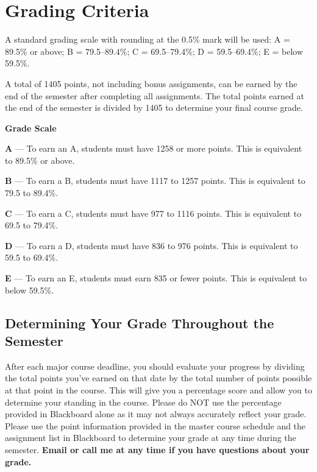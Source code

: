 \section*{Grading Criteria}

A standard grading scale with rounding at the 0.5\% mark will be used: A = 89.5\% or above; B = 79.5--89.4\%; C = 69.5--79.4\%; D = 59.5--69.4\%; E = below 59.5\%.

A total of 1405 points, not including bonus assignments, can be earned by the end of the semester after completing all assignments. The total points earned at the end of the semester is divided by 1405 to determine your final course grade.

\begin{tcolorbox}[
  enhanced,
  colback=blue!2,
  colframe=DeepBlue,
  boxrule=0.8pt,
  arc=3pt,
  left=10pt,
  right=10pt,
  top=8pt,
  bottom=8pt
]
{\bfseries\color{DeepBlue} Grade Scale}

\vspace{0.25em}

\textbf{A} --- To earn an A, students must have 1258 or more points. This is equivalent to 89.5\% or above.

\vspace{0.2em}

\textbf{B} --- To earn a B, students must have 1117 to 1257 points. This is equivalent to 79.5 to 89.4\%.

\vspace{0.2em}

\textbf{C} --- To earn a C, students must have 977 to 1116 points. This is equivalent to 69.5 to 79.4\%.

\vspace{0.2em}

\textbf{D} --- To earn a D, students must have 836 to 976 points. This is equivalent to 59.5 to 69.4\%.

\vspace{0.2em}

\textbf{E} --- To earn an E, students must earn 835 or fewer points. This is equivalent to below 59.5\%.
\end{tcolorbox}

\subsection*{Determining Your Grade Throughout the Semester}

After each major course deadline, you should evaluate your progress by dividing the total points you've earned on that date by the total number of points possible at that point in the course. This will give you a percentage score and allow you to determine your standing in the course. Please do NOT use the percentage provided in Blackboard alone as it may not always accurately reflect your grade. Please use the point information provided in the master course schedule and the assignment list in Blackboard to determine your grade at any time during the semester. \textbf{Email or call me at any time if you have questions about your grade.}

